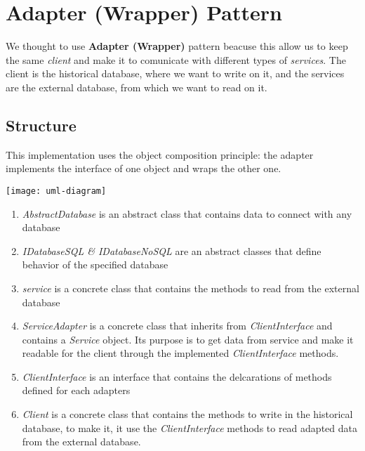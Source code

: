 \section{Adapter (Wrapper) Pattern}

We thought to use \textbf{Adapter (Wrapper)} pattern beacuse this allow us to keep the same \textit{client} and make it to comunicate with different types of \textit{services}. The client is the historical database, where we want to write on it, and the services are the external database, from which we want to read on it.

\subsection{Structure}

This implementation uses the object composition principle: the adapter implements the interface of one object and wraps the other one.

\begin{center}
\texttt{[image: uml-diagram]}
\end{center}

\begin{enumerate}
	\item \textit{AbstractDatabase} is an abstract class that contains data to connect with any database

	\item \textit{IDatabaseSQL \& IDatabaseNoSQL} are an abstract classes that define behavior of the specified database

	\item \textit{service} is a concrete class that contains the methods to read from the external database

	\item \textit{ServiceAdapter} is a concrete class that inherits from \textit{ClientInterface} and contains a \textit{Service} object. Its purpose is to get data from service and make it readable for the client through the implemented \textit{ClientInterface} methods.

	\item \textit{ClientInterface} is an interface that contains the delcarations of methods defined for each adapters

	\item \textit{Client} is a concrete class that contains the methods to write in the historical database, to make it, it use the \textit{ClientInterface} methods to read adapted data from the external database.
\end{enumerate}

